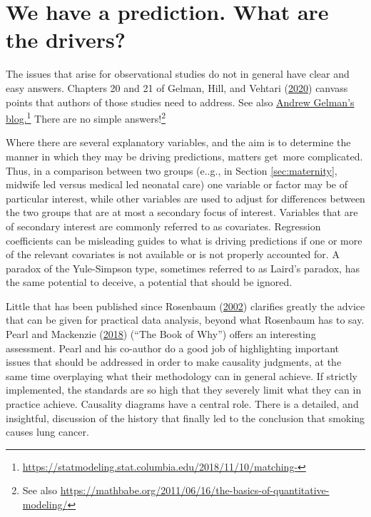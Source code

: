 \documentclass[
  10pt,
  b5paper]{book}
\begin{document}
\hypertarget{we-have-a-prediction.-what-are-the-drivers}{%
\section{We have a prediction. What are the drivers?}\label{we-have-a-prediction.-what-are-the-drivers}}

The issues that arise for observational studies do not in general have
clear and easy answers. Chapters 20 and 21 of Gelman, Hill, and Vehtari (\protect\hyperlink{ref-gelman2020regression}{2020})
canvass points that authors of those studies need to address. See also
\href{https://statmodeling.stat.columbia.edu/2018/11/10/matching-discarding-non-matches-deal-lack-complete-overlap-regression-adjust-imbalance-treatment-control-groups/}{Andrew Gelman's blog.}\footnote{\url{https://statmodeling.stat.columbia.edu/2018/11/10/matching-}} There are no simple
answers!\footnote{See also \url{https://mathbabe.org/2011/06/16/the-basics-of-quantitative-modeling/}}

Where there are several explanatory variables, and the aim is
to determine the manner in which they may be driving predictions,
matters get~more complicated. Thus, in a comparison between
two groups (e..g., in Section \ref{sec:maternity}, midwife led
versus medical led neonatal care) one variable or factor may
be of particular interest, while other variables are used to
adjust for differences between the two groups that are at
most a secondary focus of interest. Variables that are of
secondary interest are commonly referred to as covariates.
Regression coefficients can be misleading guides to what is
driving predictions if one or more of the relevant covariates
is not available or is not properly accounted for. A paradox
of the Yule-Simpson type, sometimes referred to as Laird's
paradox, has the same potential to deceive, a potential that
should be ignored.

Little that has been published since Rosenbaum (\protect\hyperlink{ref-RosBook}{2002}) clarifies greatly the
advice that can be given for practical data analysis, beyond what
Rosenbaum has to say. Pearl and Mackenzie (\protect\hyperlink{ref-pearl2018book}{2018}) (``The Book of Why'') offers an
interesting assessment. Pearl and his co-author do a good job of
highlighting important issues that should be addressed in order to
make causality judgments, at the same time overplaying what their
methodology can in general achieve. If strictly implemented,
the standards are so high that they severely limit what they can
in practice achieve. Causality diagrams have a central role.
There is a detailed, and insightful, discussion of the history
that finally led to the conclusion that smoking causes lung cancer.
\end{document}
